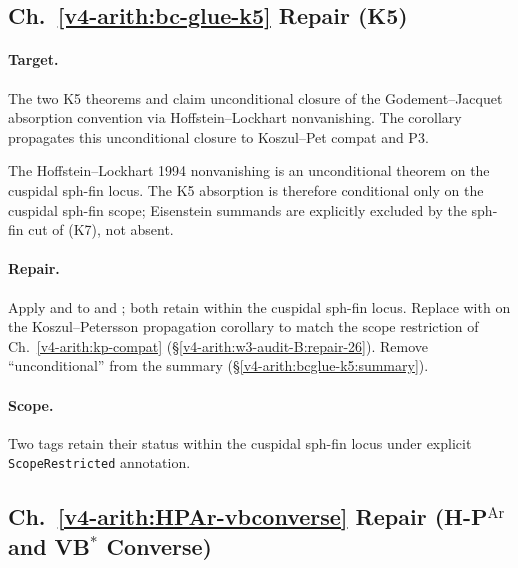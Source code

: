 \subsection{Ch.~\ref{v4-arith:bc-glue-k5} Repair (K5)}
\label{v4-arith:w3-audit-B:repair-35}

\paragraph{Target.} The two K5 theorems
 and
 claim
unconditional closure of the Godement--Jacquet absorption
convention via Hoffstein--Lockhart nonvanishing. The corollary
 propagates this
unconditional closure to Koszul--Pet compat and P3.

The Hoffstein--Lockhart 1994 nonvanishing is an unconditional theorem
on the cuspidal sph-fin locus. The K5 absorption is therefore
conditional only on the cuspidal sph-fin scope; Eisenstein summands
are explicitly excluded by the sph-fin cut of
(K7), not absent.

\paragraph{Repair.} Apply
and
to  and
; both retain
\ClaimStatusProvedHere{} within the cuspidal sph-fin locus. Replace
\ClaimStatusProvedHere{} with \ClaimStatusProvedHereConditional{} on
the Koszul--Petersson propagation corollary
 to match the scope
restriction of Ch.~\ref{v4-arith:kp-compat}
(\S\ref{v4-arith:w3-audit-B:repair-26}). Remove ``unconditional''
from the summary (\S\ref{v4-arith:bcglue-k5:summary}).

\paragraph{Scope.} Two \ClaimStatusProvedHere{} tags retain their
status within the cuspidal sph-fin locus under explicit
\texttt{ScopeRestricted} annotation.

\subsection{Ch.~\ref{v4-arith:HPAr-vbconverse} Repair (H-P\(^{\mathrm{Ar}}\) and VB\(^{*}\) Converse)}
\label{v4-arith:w3-audit-B:repair-36}

